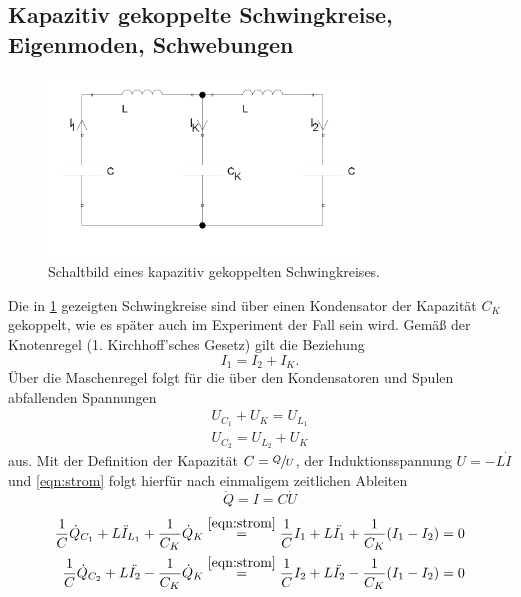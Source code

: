 \subsection{Kapazitiv gekoppelte Schwingkreise, Eigenmoden, Schwebungen}
\begin{figure}
    \centering
    \includegraphics[width=0.75\textwidth]{plots/allg_gekopp_schwingkreis.png}
    \caption{Schaltbild eines kapazitiv gekoppelten Schwingkreises.}
    \label{fig:kap_gekopp}
\end{figure}
Die in \ref{fig:kap_gekopp} gezeigten Schwingkreise sind über einen Kondensator der Kapazität $C_K$ gekoppelt, wie es 
später auch im Experiment der Fall sein wird. 
Gemäß der Knotenregel (1. Kirchhoff'sches Gesetz) gilt die Beziehung
\begin{equation}
    I_1 = I_2 + I_K .
    \label{eqn:strom}
\end{equation}
Über die Maschenregel folgt für die über den Kondensatoren und Spulen abfallenden Spannungen 
\begin{align} %
    U_{C_1} + U_K = U_{L_1} 
    \label{eqn:masche1} \\
    U_{C_2} = U_{L_2} + U_K  
    \label{eqn:masche2} 
\end{align}
aus.
Mit der Definition der Kapazität ${C=\sfrac{Q}{U}}$, der Induktionsspannung ${U=- L \dot{I}}$ und \eqref{eqn:strom} folgt 
hierfür nach einmaligem zeitlichen Ableiten 
\begin{equation}
    \dot{Q} = I = C \dot{U} 
\end{equation}
\begin{align}
    \frac{1}{C} \dot{Q}_{C_1} + L \ddot{I}_{L_1} + \frac{1}{C_K} \dot{Q}_{K} \stackrel{\eqref{eqn:strom}}{=} 
    \frac{1}{C} I_1 + L \ddot{I_1} + \frac{1}{C_K} (I_1 - I_2) = 0 \label{eqn:dgl1} \\
    \frac{1}{C} \dot{Q}_{C_2} + L \ddot{I_2} - \frac{1}{C_K} \dot{Q}_{K} \stackrel{\eqref{eqn:strom}}{=}
    \frac{1}{C} I_2 + L \ddot{I_2} - \frac{1}{C_K} (I_1 - I_2) = 0 \label{eqn:dgl2}
\end{align}
